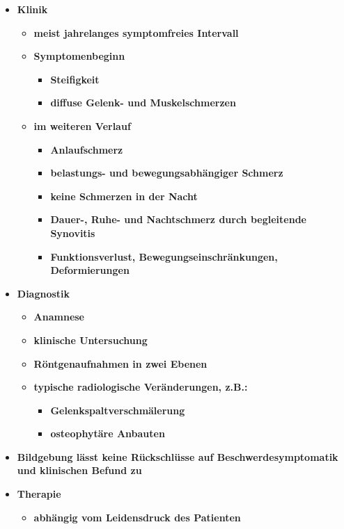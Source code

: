 \begin{itemize}
		\item \textbf{Klinik}
			\begin{itemize}
				\item \textbf{meist jahrelanges symptomfreies Intervall}
				\item \textbf{Symptomenbeginn}
					\begin{itemize}
						\item \textbf{Steifigkeit}
						\item \textbf{diffuse Gelenk- und Muskelschmerzen}
					\end{itemize}
				\item \textbf{im weiteren Verlauf}
					\begin{itemize}
						\item \textbf{Anlaufschmerz}
						\item \textbf{belastungs- und bewegungsabhängiger Schmerz}
						\item \textbf{keine Schmerzen in der Nacht}
						\item \textbf{Dauer-, Ruhe- und Nachtschmerz durch begleitende Synovitis}
						\item \textbf{Funktionsverlust, Bewegungseinschränkungen, Deformierungen}
					\end{itemize}
			\end{itemize}
		\item \textbf{Diagnostik}
			\begin{itemize}
				\item \textbf{Anamnese}
				\item \textbf{klinische Untersuchung}
				\item \textbf{Röntgenaufnahmen in zwei Ebenen}
				\item \textbf{typische radiologische Veränderungen, z.B.:}
					\begin{itemize}
						\item \textbf{Gelenkspaltverschmälerung}
						\item \textbf{osteophytäre Anbauten}
					\end{itemize}
			\end{itemize}
		\item \textbf{Bildgebung lässt keine Rückschlüsse auf Beschwerdesymptomatik und klinischen Befund zu}
		\item \textbf{Therapie}
			\begin{itemize}
				\item \textbf{abhängig vom Leidensdruck des Patienten}
					\begin{itemize}

\end{itemize}
\end{itemize}
\end{itemize}
